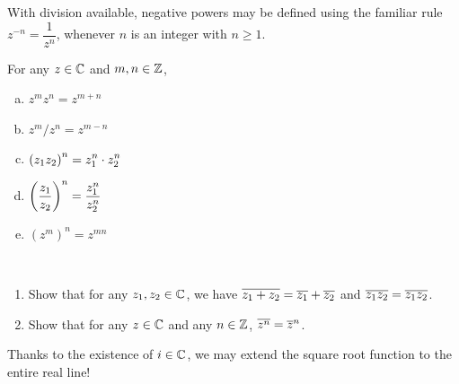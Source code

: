\documentclass[11pt,fleqn,dvipsnames,usenames]{article}
\newcommand{\p}{\noindent}
\begin{document}
\p With division available, negative powers may be defined using the familiar rule $z^{-n} = \dfrac{1}{z^{n}}$, whenever $n$ is an integer with $n\geq 1$.
\vsp

\properties For any $z\in\mathbb{C}$ and $m,n\in\mathbb{Z}$,
\begin{enumerate}[(a)]
\item $z^{m}z^{n} = z^{m+n}$
\item $z^{m}/z^{n} = z^{m-n}$
\item $\displaystyle{\left(z_{1}z_{2}\right)^{n} = z_{1}^{n}\cdot z_{2}^{n}}$
\item $\displaystyle{\left(\frac{z_{1}}{z_{2}}\right)^{n} = \frac{z_{1}^{n}}{z_{2}^{n}}}$
\item $\left(z^{m}\right)^{n} = z^{mn}$
\end{enumerate}
\vsp

\begin{exercises}\label{complexconjugateexercises}~
\begin{enumerate}[1.]
\item Show that for any $z_{1},z_{2}\in\mathbb{C}$, we have $\overline{z_{1} + z_{2}} = \overline{z_{1}} + \overline{z_{2}}$ and $\overline{z_{1}z_{2}} = \overline{z_{1}}\overline{z_{2}}$.
\item Show that for any $z\in\mathbb{C}$ and any $n\in\mathbb{Z}$, $\overline{z^{n}} = \overline{z}^{n}$.
\end{enumerate}
\end{exercises}

\p Thanks to the existence of $i\in\mathbb{C}$, we may extend the square root function to the entire real line!
\end{document}
